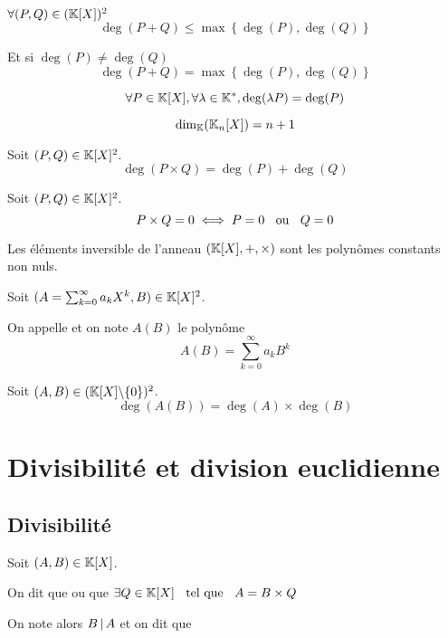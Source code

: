 \begin{prp}
  $\forall (P, Q) \in (\mathbb{K}[X])^2$
  \[
    \deg(P + Q) \leq \max \left\{ \deg(P), \deg(Q) \right\}
  \]

  Et si $\deg(P) \neq \deg(Q)$
  \[
    \deg(P + Q) = \max \left\{ \deg(P), \deg(Q) \right\}
  \]
\end{prp}

\begin{prp}
\[
  \forall P \in \mathbb{K}[X], \forall \lambda \in \mathbb{K}^*, \deg (\lambda P) = \deg(P)
\]
\end{prp}

\begin{cor}
  \[
    \dim_{\mathbb{K}}(\mathbb{K}_n[X]) = n + 1
  \]
\end{cor}

\begin{prp}
  Soit $(P, Q) \in \mathbb{K}[X]^2$.
  \[
    \deg(P \times Q) = \deg(P) + \deg(Q)
  \]
\end{prp}

\begin{cor}
  Soit $(P, Q) \in \mathbb{K}[X]^2$.
  \[
    P \times Q = 0 \iff P = 0 \;\;\text{ ou }\;\; Q = 0
  \]
\end{cor}

\begin{cor}
  Les éléments inversible de l'anneau $(\mathbb{K}[X], +, \times)$ sont
  les polynômes constants non nuls.
\end{cor}

\begin{dfn}
  Soit $(A = \sum^\infty_{k = 0} a_k X^k, B) \in \mathbb{K}[X]^2$.

  On appelle  et on note
  $A(B)$ le polynôme
  \[
    A(B) = \sum^\infty_{k = 0} a_k B^k
  \]
\end{dfn}

\begin{prp}
  Soit $(A, B) \in (\mathbb{K}[X] \backslash \{0\})^2$.
  \[
    \deg(A(B)) = \deg(A) \times \deg(B)
  \]
\end{prp}

\section{Divisibilité et division euclidienne}

\subsection{Divisibilité}

\begin{dfn}
  Soit $(A, B) \in \mathbb{K}[X]$.

  On dit que  ou que \ssi
  $\exists Q \in \mathbb{K}[X] \;\;\text{ tel que }\;\; A = B \times Q$

  On note alors $B \operatorname{|} A$ et on dit que
\end{dfn}

